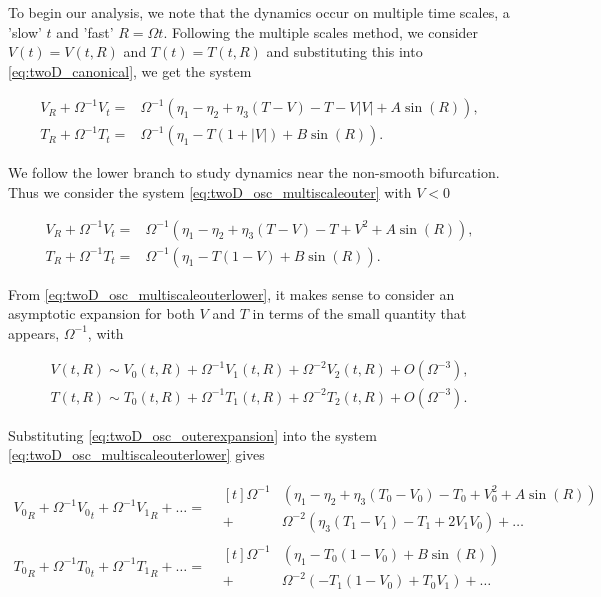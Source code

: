 To begin our analysis, we note that the dynamics occur on multiple time scales, a 'slow' $t$ and 'fast' $R = \Omega t$. Following the multiple scales method, we consider $V(t)=V(t,R)$ and $T(t)=T(t,R)$ and substituting this into \eqref{eq:twoD_canonical}, we get the system

\begin{equation}\label{eq:twoD_osc_multiscaleouter}
\begin{aligned}
V_R+\Omega^{-1}V_t = & \Omega^{-1}\left(\eta_1-\eta_2+\eta_3(T-V)-T-V|V|+A\sin(R)\right),\\
T_R+\Omega^{-1}T_t = & \Omega^{-1}\left(\eta_1-T(1+|V|)+B\sin(R)\right).
\end{aligned}
\end{equation}

We follow the lower branch to study dynamics near the non-smooth bifurcation. Thus we consider the system \eqref{eq:twoD_osc_multiscaleouter} with $V<0$

\begin{equation}\label{eq:twoD_osc_multiscaleouterlower}
\begin{aligned}
V_R+\Omega^{-1}V_t = & \Omega^{-1}\left(\eta_1-\eta_2+\eta_3(T-V)-T+V^2+A\sin(R)\right),\\
T_R+\Omega^{-1}T_t = & \Omega^{-1}\left(\eta_1-T(1-V)+B\sin(R)\right).
\end{aligned}
\end{equation}

From \eqref{eq:twoD_osc_multiscaleouterlower}, it makes sense to consider an asymptotic expansion for both $V$ and $T$ in terms of the small quantity that appears, $\Omega^{-1}$, with

\begin{equation}\label{eq:twoD_osc_outerexpansion}
\begin{aligned}
V(t,R)\sim V_0(t,R) +\Omega^{-1}V_1(t,R) +\Omega^{-2}V_2(t,R)+O(\Omega^{-3}),\\
T(t,R)\sim T_0(t,R) +\Omega^{-1}T_1(t,R) +\Omega^{-2}T_2(t,R)+O(\Omega^{-3}).
\end{aligned}
\end{equation}

Substituting \eqref{eq:twoD_osc_outerexpansion} into the system \eqref{eq:twoD_osc_multiscaleouterlower} gives

\begin{equation*}
\begin{aligned}
{V_0}_R+\Omega^{-1}{V_0}_t+\Omega^{-1}{V_1}_R+\ldots=&\begin{aligned}[t]\Omega^{-1}&(\eta_1-\eta_2+\eta_3(T_0-V_0)-T_0+V_0^2+A\sin(R))\\
+&\Omega^{-2}(\eta_3(T_1-V_1)-T_1+2V_1V_0)+\ldots
\end{aligned}\\
{T_0}_R+\Omega^{-1}{T_0}_t+\Omega^{-1}{T_1}_R+\ldots=&\begin{aligned}[t]  \Omega^{-1}&(\eta_1-T_0(1-V_0)+B\sin(R))\\
+&\Omega^{-2}(-T_1(1-V_0)+T_0V_1)+\ldots
\end{aligned}
\end{aligned}
\end{equation*}

